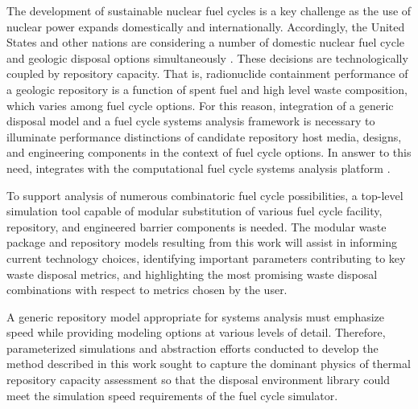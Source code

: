 
The development of sustainable nuclear fuel cycles is a key challenge as the 
use of nuclear power expands domestically and internationally.  Accordingly, 
the United States and other nations are considering a number of domestic nuclear fuel 
cycle and geologic disposal options simultaneously \cite{doe_strategy_2013, 
von_lensa_red-impact_2008}.  These decisions 
are technologically coupled by repository capacity. That is, 
radionuclide containment performance of a geologic repository is a function of 
spent fuel and high level waste composition, which varies among fuel cycle 
options. For this reason, integration of a generic disposal model and a fuel 
cycle systems analysis framework is necessary to illuminate performance 
distinctions of candidate repository host media, designs, and engineering 
components in the context of fuel cycle options.  In answer to this need, \Cyder 
integrates with the \Cyclus computational fuel cycle systems analysis platform 
\cite{huff_cyder_2013,wilson_cyclus:_2012}. 



To support analysis of numerous combinatoric fuel cycle possibilities, a 
top-level simulation tool capable of modular substitution of various fuel cycle 
facility, repository, and engineered barrier components is needed. The modular 
waste package and repository models resulting from this work will assist in 
informing current technology choices, identifying important parameters 
contributing to key waste disposal metrics, and highlighting the most promising 
waste disposal combinations with respect to metrics chosen by the user. 


A generic repository model appropriate for systems analysis must emphasize 
speed while providing modeling options at various levels of 
detail. Therefore, parameterized simulations and abstraction efforts conducted to develop 
the method described in this work sought to capture the dominant physics of 
thermal repository capacity assessment so that the \Cyder disposal environment 
library could meet the simulation speed requirements of the \Cyclus fuel cycle 
simulator.


